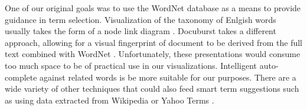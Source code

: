 One of our original goals was to use the WordNet database as a means to provide guidance in term selection.  Visualization of the taxonomy of Enlgish words usually takes the form of a node link diagram \cite{collins2006wordnet,wordvis}.  Docuburst takes a different approach, allowing for a visual fingerprint of document to be derived from the full text combined with WordNet \cite{fellbaum2010wordnet}.  Unfortunately, these presentations would consume too much space to be of practical use in our visualizations.  Intelligent auto-complete against related words is be more suitable for our purposes.  There are a wide variety of other techniques that could also feed smart term suggestions such as using data extracted from Wikipedia or Yahoo Terms \cite{dakka2008automatic}.
